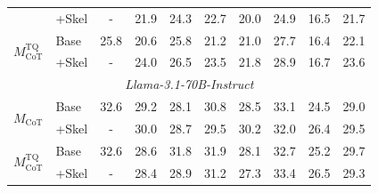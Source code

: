 \begin{table}[t]
\begin{tabular}{llcccccccc}
& +Skel & - & 21.9 & 24.3 & 22.7 & 20.0 & 24.9 & 16.5 & 21.7 \\
\multirow{2}{*}{$M_{\text{CoT}}^{\text{TQ}}$} & Base & 25.8 & 20.6 & 25.8 & 21.2 & 21.0 & 27.7 & 16.4 & 22.1 \\
& +Skel & - & 24.0 & 26.5 & 23.5 & 21.8 & 28.9 & 16.7 & 23.6 \\
\midrule
\multicolumn{10}{c}{\textit{Llama-3.1-70B-Instruct}} \\
\multirow{2}{*}{$M_{\text{CoT}}$} & Base & 32.6 & 29.2 & 28.1 & 30.8 & 28.5 & 33.1 & 24.5 & 29.0 \\
& +Skel & - & 30.0 & 28.7 & 29.5 & 30.2 & 32.0 & 26.4 & 29.5 \\
\multirow{2}{*}{$M_{\text{CoT}}^{\text{TQ}}$} & Base & 32.6 & 28.6 & 31.8 & 31.9 & 28.1 & 32.7 & 25.2 & 29.7 \\
& +Skel & - & 28.4 & 28.9 & 31.2 & 27.3 & 33.4 & 26.5 & 29.3 \\
\bottomrule
\end{tabular}

\end{table}

